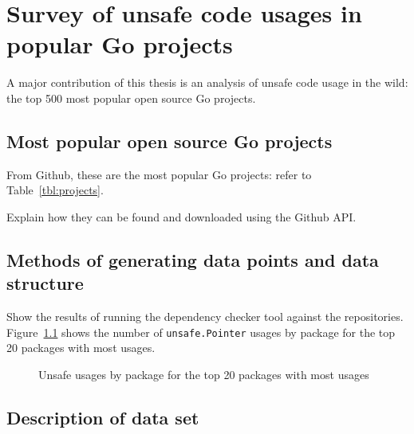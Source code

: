 
\chapter{Survey of unsafe code usages in popular Go projects}\label{ch:survey}

A major contribution of this thesis is an analysis of unsafe code usage in the wild:
the top 500 most popular open source Go projects.



\section{Most popular open source Go projects}\label{sec:most-popular-projects}

From Github, these are the most popular Go projects: refer to Table~\ref{tbl:projects}.

Explain how they can be found and downloaded using the Github API.



\section{Methods of generating data points and data structure}\label{sec:survey-acquisition-methods}

Show the results of running the dependency checker tool against the repositories. Figure~\ref{fig:unsafe-usages-by-package-n20}
shows the number of \texttt{unsafe.Pointer} usages by package for the top 20 packages with most usages.

\begin{figure}[h]
    \begin{center}
        
    \end{center}
    \caption{Unsafe usages by package for the top 20 packages with most usages}
    \label{fig:unsafe-usages-by-package-n20}
\end{figure}



\section{Description of data set}\label{sec:survey-dataset}

